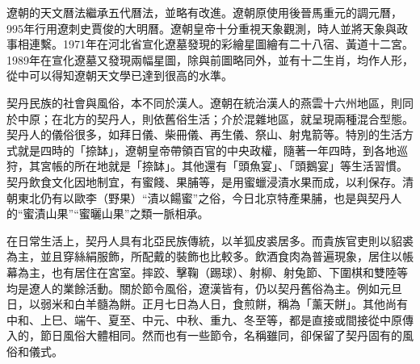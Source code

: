遼朝的天文曆法繼承五代曆法，並略有改進。遼朝原使用後晉馬重元的調元曆，995年行用遼刺史賈俊的大明曆。遼朝皇帝十分重視天象觀測，時人並將天象與政事相連繫。1971年在河北省宣化遼墓發現的彩繪星圖繪有二十八宿、黃道十二宮。1989年在宣化遼墓又發現兩幅星圖，除與前圖略同外，並有十二生肖，均作人形，從中可以得知遼朝天文學已達到很高的水準。

契丹民族的社會與風俗，本不同於漢人。遼朝在統治漢人的燕雲十六州地區，則同於中原；在北方的契丹人，則依舊俗生活；介於混雜地區，就呈現兩種混合型態。契丹人的儀俗很多，如拜日儀、柴冊儀、再生儀、祭山、射鬼箭等。特別的生活方式就是四時的「捺缽」，遼朝皇帝帶領百官的中央政權，隨著一年四時，到各地巡狩，其宮帳的所在地就是「捺缽」。其他還有「頭魚宴」、「頭鵝宴」等生活習慣。契丹飲食文化因地制宜，有蜜餞、果脯等，是用蜜蠟浸漬水果而成，以利保存。清朝東北仍有以歐李（野果）“漬以餳蜜”之俗，今日北京特產果脯，也是與契丹人的“蜜漬山果”“蜜曬山果”之類一脈相承。

在日常生活上，契丹人具有北亞民族傳統，以羊狐皮裘居多。而貴族官吏則以貂裘為主，並且穿絲絹服飾，所配戴的裝飾也比較多。飲酒食肉為普遍現象，居住以帳幕為主，也有居住在宮室。摔跤、擊鞠（踢球）、射柳、射兔節、下圍棋和雙陸等均是遼人的業餘活動。關於節令風俗，遼漢皆有，仍以契丹舊俗為主。例如元旦日，以弱米和白羊髓為餅。正月七日為人日，食煎餅，稱為「薰天餅」。其他尚有中和、上巳、端午、夏至、中元、中秋、重九、冬至等，都是直接或間接從中原傳入的，節日風俗大體相同。然而也有一些節令，名稱雖同，卻保留了契丹固有的風俗和儀式。














